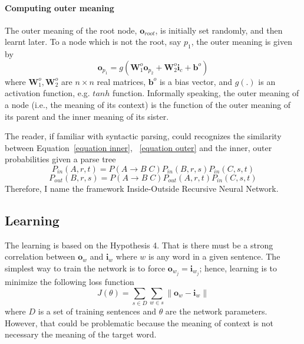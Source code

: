 \documentclass[10pt]{article}
\begin{document}
\paragraph{Computing outer meaning} The outer meaning of the root node, $\mathbf{o}_{root}$, is initially 
set randomly, and then learnt later. To a node which is not the root, say $p_1$, the outer meaning is given by
\begin{equation}
	\mathbf{o}_{p_1} = g(\mathbf{W}_1^o \mathbf{o}_{p_2} + \mathbf{W}_2^o \mathbf{i}_{c} + \mathbf{b}^o)
	\label{equation outer}
\end{equation}
where $\mathbf{W}_1^o, \mathbf{W}_2^o$ are $n \times n$ real matrices, 
$\mathbf{b}^o$ is a bias vector, and $g(.)$ is an activation function, e.g. $tanh$ 
function. Informally speaking, the outer meaning of a node (i.e., the meaning of 
its context) is the function of the outer meaning of its parent and the inner meaning 
of its sister. 

The reader, if familiar with syntactic parsing, could recognizes the similarity between 
Equation~\ref{equation inner}, ~\ref{equation outer}
and the inner, outer probabilities given a parse tree
\begin{equation}
	P_{in}(A,r,t) = P(A \rightarrow B\;C) P_{in}(B,r,s) P_{in}(C,s,t)
\end{equation}
\begin{equation}
	P_{out}(B,r,s) = P(A \rightarrow B\;C) P_{out}(A,r,t) P_{in}(C,s,t)
\end{equation}
Therefore, I name the framework Inside-Outside Recursive Neural Network.

\subsection{Learning}
The learning is based on the Hypothesis 4. That is there must be a strong correlation 
between $\mathbf{o}_{w}$ and $\mathbf{i}_{w}$ where $w$ is any word in 
a given sentence. The simplest way to train the network is to force 
$\mathbf{o}_{w_j} = \mathbf{i}_{w_j}$; hence, learning is to minimize the following 
loss function
\begin{equation}
	J(\theta) = \sum_{s \in D} \sum_{w \in s} \| \mathbf{o}_{w} - \mathbf{i}_{w} \|
\end{equation}
where $D$ is a set of training sentences and $\theta$ are the network parameters. 
However, that could be problematic because 
the meaning of context is not necessary the meaning of the target word.
\end{document}
